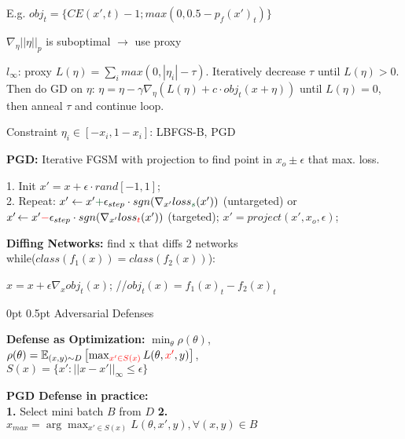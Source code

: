 \documentclass[11pt,landscape,a4paper,fleqn]{article}
\makeatletter
\renewcommand{\section}{\@startsection{section}{1}{0mm}%
                                {0pt}%
                                {0.5pt}%
                                {\color{myorange}\sffamily\small\bfseries}}
\makeatother
\begin{document}
\begin{multicols*}{4}
E.g. {\fontsize{9.5}{6}\selectfont \mbox{$obj_t = \{ CE(x', t) - 1; max(0, 0.5 - p_f(x')_t)\}$}}

$\nabla_\eta ||\eta||_p$ is suboptimal $\rightarrow$ use proxy 

$l_\infty$: proxy $L(\eta) = \sum_i max(0, |\eta_i| - \tau)$. Iteratively decrease $\tau$ until $L(\eta)>0$. Then do GD on $\eta$: $\eta = \eta - \gamma \nabla_\eta(L(\eta) + c \cdot obj_t(x+\eta))$ until $L(\eta) = 0$, then anneal $\tau$ and continue loop.

Constraint $\eta_i \in [-x_i,1-x_i]$: LBFGS-B, PGD

\vspace*{1mm}


\textbf{PGD:} Iterative FGSM with projection to find point in $x_o \pm \epsilon$ that max. loss.

1. Init $x' = x + \epsilon \cdot rand[-1,1]$;\\
2. Repeat: $x' \leftarrow x' \textcolor{darkgreen}{+} \epsilon_{step} \cdot sgn(\nabla_{x'} loss_{\textcolor{darkgreen}{s}} (x'))$ (untargeted) or $x'\hspace*{-0.5mm} \leftarrow x' \textcolor{red}{-} \epsilon_{step} \cdot sgn(\nabla_{x'} loss_{\textcolor{red}{t}} (x'))$ (targeted);
$x' = project(x', x_o, \epsilon)$;
\vspace*{1mm}

\textbf{Diffing Networks:} find x that diffs 2 networks\\
while($class(f_1(x)) = class(f_2(x))$):

\quad $x = x + \epsilon \nabla_x obj_t(x)$;  {\fontsize{9.5}{6}\selectfont /\!\!/$obj_t(x) = f_1(x)_t - f_2(x)_t$}

\section{Adversarial Defenses}

\textbf{Defense as Optimization:} $\min_\theta \rho(\theta)$,
 {$\rho(\theta) = \mathbb{E}_{(x,y) \sim D} \left[ \max_{\textcolor{red}{x' \in S(x)}} L(\theta, \textcolor{red}{x'}, y) \right]$},\\
$S(x) = \{ x': ||x - x'||_\infty \leq \epsilon \}$

\textbf{PGD Defense in practice:}\\
\textbf{1.} Select mini batch $B$ from $D$
\textbf{2.} $x_{max} = \arg\max_{x' \in S(x)} L(\theta, x', y), \forall (x,y) \in B$


\end{multicols*}
\end{document}
